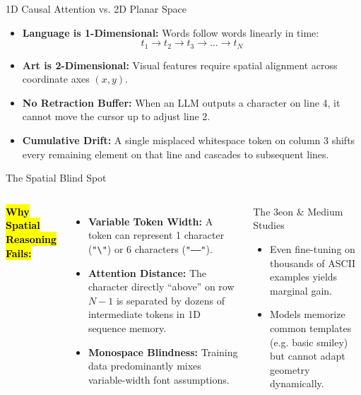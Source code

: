 \documentclass[12pt]{beamer}
\begin{document}
\begin{frame}{1D Causal Attention vs. 2D Planar Space}
  \begin{itemize}
    \item \textbf{Language is 1-Dimensional:} Words follow words linearly in time:
      \[
        t_1 \longrightarrow t_2 \longrightarrow t_3 \longrightarrow \dots \longrightarrow t_N
      \]
    \item \textbf{Art is 2-Dimensional:} Visual features require spatial alignment across coordinate axes $(x, y)$.
    \item \textbf{No Retraction Buffer:} When an LLM outputs a character on line 4, it cannot move the cursor up to adjust line 2.
    \item \textbf{Cumulative Drift:} A single misplaced whitespace token on column 3 shifts every remaining element on that line and cascades to subsequent lines.
  \end{itemize}
\end{frame}

\begin{frame}{The Spatial Blind Spot}
  \begin{columns}[T]
      \textbf{\hl{Why Spatial Reasoning Fails:}}
      \begin{itemize}
        \item \textbf{Variable Token Width:} A token can represent 1 character (\texttt{"\textbackslash{}"}) or 6 characters (\texttt{"------"}).
        \item \textbf{Attention Distance:} The character directly ``above'' on row $N-1$ is separated by dozens of intermediate tokens in 1D sequence memory.
        \item \textbf{Monospace Blindness:} Training data predominantly mixes variable-width font assumptions.
      \end{itemize}

      \begin{block}{The 3eon \& Medium Studies}
        \small
        \begin{itemize}
          \item Even fine-tuning on thousands of ASCII examples yields marginal gain.
          \item Models memorize common templates (e.g. basic smiley) but cannot adapt geometry dynamically.
        \end{itemize}
      \end{block}
      \vspace{0.2cm}
      \footnotesize{}
  \end{columns}
\end{frame}
\end{document}
